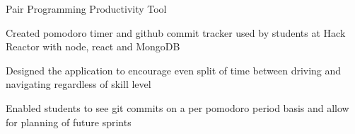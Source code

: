 \begin{cventries}
  \cventry
    {} %
    {Pair Programming Productivity Tool} %
    {} %
    {} %
    {
      \begin{cvitems} %
      	\item {Created pomodoro timer and github commit tracker used by students at Hack Reactor with node, react and MongoDB}
        \item {Designed the application to encourage even split of time between driving and navigating regardless of skill level}
        \item {Enabled students to see git commits on a per pomodoro period basis and allow for planning of future sprints}
      \end{cvitems}
    }
\end{cventries}